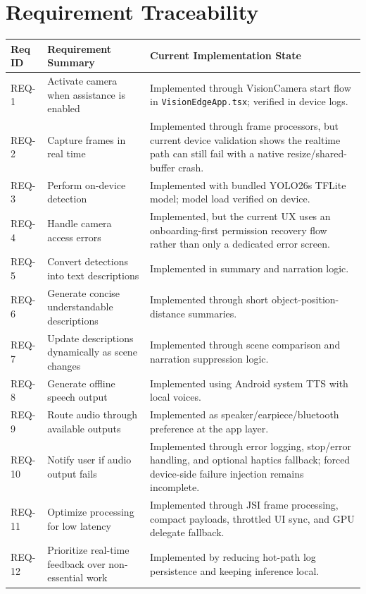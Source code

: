 \documentclass[conference]{IEEEtran}
\begin{document}
\section{Requirement Traceability}
\begin{table}[t]
\centering
\begin{tabularx}{\textwidth}{>{\raggedright\arraybackslash}p{} >{\raggedright\arraybackslash}p{} >{\raggedright\arraybackslash}X}
\toprule
Req ID & Requirement Summary & Current Implementation State \\
\midrule
REQ-1 & Activate camera when assistance is enabled & Implemented through VisionCamera start flow in \texttt{VisionEdgeApp.tsx}; verified in device logs. \\
REQ-2 & Capture frames in real time & Implemented through frame processors, but current device validation shows the realtime path can still fail with a native resize/shared-buffer crash. \\
REQ-3 & Perform on-device detection & Implemented with bundled YOLO26s TFLite model; model load verified on device. \\
REQ-4 & Handle camera access errors & Implemented, but the current UX uses an onboarding-first permission recovery flow rather than only a dedicated error screen. \\
REQ-5 & Convert detections into text descriptions & Implemented in summary and narration logic. \\
REQ-6 & Generate concise understandable descriptions & Implemented through short object-position-distance summaries. \\
REQ-7 & Update descriptions dynamically as scene changes & Implemented through scene comparison and narration suppression logic. \\
REQ-8 & Generate offline speech output & Implemented using Android system TTS with local voices. \\
REQ-9 & Route audio through available outputs & Implemented as speaker/earpiece/bluetooth preference at the app layer. \\
REQ-10 & Notify user if audio output fails & Implemented through error logging, stop/error handling, and optional haptics fallback; forced device-side failure injection remains incomplete. \\
REQ-11 & Optimize processing for low latency & Implemented through JSI frame processing, compact payloads, throttled UI sync, and GPU delegate fallback. \\
REQ-12 & Prioritize real-time feedback over non-essential work & Implemented by reducing hot-path log persistence and keeping inference local. \\

\end{tabularx}
\end{table}
\end{document}
